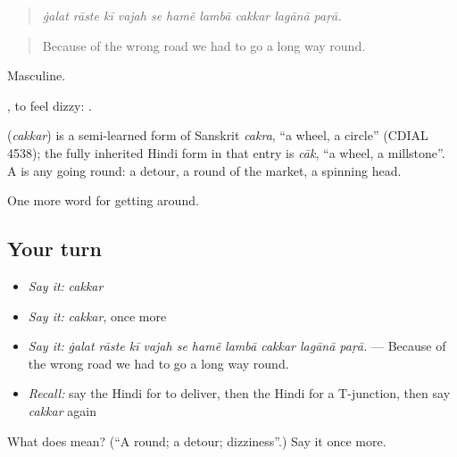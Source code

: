 \begin{quote}
         
\end{quote}

\begin{quote}
\emph{ġalat rāste kī vajah se hamẽ lambā cakkar lagānā paṛā.}
\end{quote}

\begin{quote}
Because of the wrong road we had to go a long way round.
\end{quote}

Masculine.

 , to feel dizzy:     .

\begin{cousinweb}
\textbf{} (\emph{cakkar}) is a semi-learned form of Sanskrit \emph{cakra}, \textquotedblleft{}a wheel, a circle\textquotedblright{} (CDIAL 4538); the fully inherited Hindi form in that entry is \emph{cāk}, \textquotedblleft{}a wheel, a millstone\textquotedblright{}. A  is any going round: a detour, a round of the market, a spinning head.
\end{cousinweb}

\begin{grammarlens}[title={What you've built}]
One more word for getting around.
\end{grammarlens}

\subsection*{Your turn}
\begin{itemize}
\raggedright
  \item \emph{Say it:} \emph{cakkar}
  \item \emph{Say it:} \emph{cakkar}, once more
  \item \emph{Say it:} \emph{ġalat rāste kī vajah se hamẽ lambā cakkar lagānā paṛā.} — Because of the wrong road we had to go a long way round.
  \item \emph{Recall:} say the Hindi for to deliver, then the Hindi for a T-junction, then say \emph{cakkar} again
\end{itemize}

\begin{tcolorbox}[breakable,colback=teal!4,colframe=teal!35!black,title={Before you move on}]
What does  mean? (\textquotedblleft{}A round; a detour; dizziness\textquotedblright{}.) Say it once more.
\end{tcolorbox}

